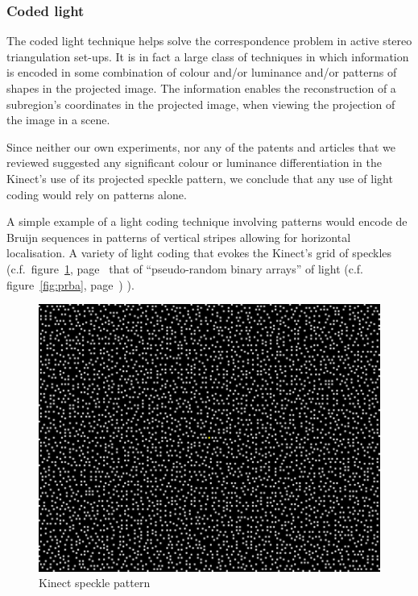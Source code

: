 \subsubsection{Coded light}

The coded light technique helps solve the correspondence problem in active
stereo triangulation set-ups. It is in fact a large class of techniques in which
information is encoded in some combination of colour and/or luminance and/or
patterns of shapes in the projected image. The information enables the
reconstruction of a subregion's coordinates in the projected image, when viewing
the projection of the image in a scene.

Since neither our own experiments, nor any of the patents and articles that we
reviewed suggested any significant colour or luminance differentiation in the
Kinect's use of its projected speckle pattern, we conclude that any use of light
coding would rely on patterns alone.

A simple example of a light coding technique involving patterns would encode de
Bruijn sequences in patterns of vertical stripes %
allowing for horizontal
localisation. A variety of light coding that evokes the Kinect's grid of
speckles (c.f.\ figure~\ref{fig:speckle}, page~\pageref{fig:speckle} that of
``pseudo-random binary arrays'' of light (c.f. figure~\ref{fig:prba},
page~\pageref{fig:prba}) \cite{geng2011structured}).

\begin{figure}[ht]
    \begin{center}
        \includegraphics[width=1.0\textwidth]{images/speckle.pdf}
        \caption{Kinect speckle pattern}
        \label{fig:speckle}
    \end{center}
\end{figure}


